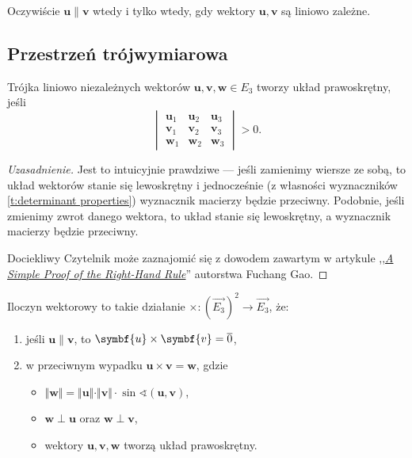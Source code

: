 Oczywiście $\symbf{u} \parallel \symbf{v}$ wtedy i tylko wtedy, gdy wektory $\symbf{u}, \symbf{v}$ są liniowo zależne.

\subsection{Przestrzeń trójwymiarowa}
\begin{fact}
    Trójka liniowo niezależnych wektorów $\symbf{u}, \symbf{v}, \symbf{w} \in E_3$ tworzy układ prawoskrętny, jeśli
    \[ \begin{vmatrix}
        \symbf{u}_1 & \symbf{u}_2 & \symbf{u}_3 \\
        \symbf{v}_1 & \symbf{v}_2 & \symbf{v}_3 \\
        \symbf{w}_1 & \symbf{w}_2 & \symbf{w}_3
    \end{vmatrix} > 0. \]
\end{fact}
\begin{proof}[Uzasadnienie]
    Jest to intuicyjnie prawdziwe --- jeśli zamienimy wiersze ze sobą, to układ wektorów stanie się lewoskrętny i jednocześnie (z własności wyznaczników \ref{t:determinant properties}) wyznacznik macierzy będzie przeciwny. Podobnie, jeśli zmienimy zwrot danego wektora, to układ stanie się lewoskrętny, a wyznacznik macierzy będzie przeciwny.

    Dociekliwy Czytelnik może zaznajomić się z dowodem zawartym w artykule ,,\textit{\href{https://sites.math.washington.edu/~marshall/math_136/right-hand-rule.pdf}{A Simple Proof of the Right-Hand Rule}}'' autorstwa Fuchang Gao.
\end{proof}

\begin{definition}
    \label{d:cross product}
    Iloczyn wektorowy to takie działanie $\times : (\overrightarrow{E_3})^2 \to \overrightarrow{E_3}$, że:
    \begin{enumerate}
        \item jeśli $\symbf{u} \parallel \symbf{v}$, to $\symbf{u} \times \symbf{v} = \ol{0}$,
        \item w przeciwnym wypadku $\symbf{u} \times \symbf{v} = \symbf{w}$, gdzie
            \begin{itemize}
                \item $\Vert\symbf{w}\Vert = \Vert\symbf{u}\Vert \cdot \Vert\symbf{v}\Vert\cdot\sin\sphericalangle(\symbf{u}, \symbf{v})$,
                \item $\symbf{w} \perp \symbf{u}$ oraz $\symbf{w} \perp \symbf{v}$,
                \item wektory $\symbf{u}, \symbf{v}, \symbf{w}$ tworzą układ prawoskrętny.
            \end{itemize}
    \end{enumerate}
\end{definition}

